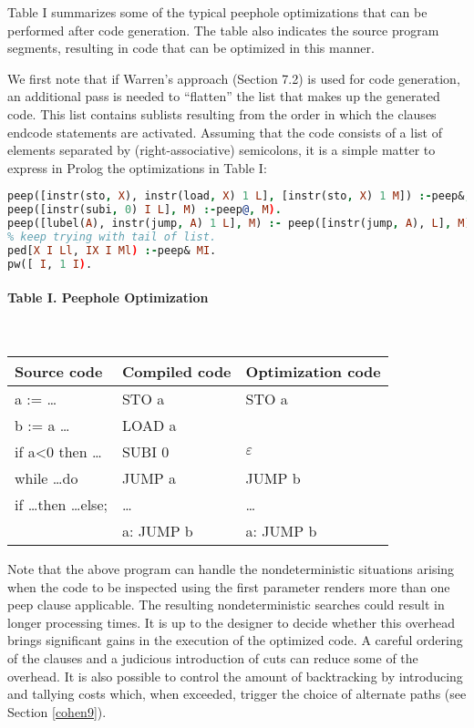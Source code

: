 \label{cohen82}

Table I summarizes some of the typical peephole optimizations that can be
performed after code generation. The table also indicates the source program
segments, resulting in code that can be optimized in this manner. 

We first note that if Warren’s approach (Section 7.2) is used for code generation,
an additional pass is needed to “flatten” the list that makes up the generated
code. This list contains sublists resulting from the order in which the clauses
endcode statements are activated. Assuming that the code consists of a list of
elements separated by (right-associative) semicolons, it is a simple matter to
express in Prolog the optimizations in Table I:
\begin{lstlisting}[language=prolog]
% if pattern is found perform the optimization.
peep([instr(sto, X), instr(load, X) 1 L], [instr(sto, X) 1 M]) :-peep&, M).
peep([instr(subi, 0) I L], M) :-peep@, M).
peep([lubel(A), instr(jump, A) 1 L], M) :- peep([instr(jump, A), L], M).
% keep trying with tail of list.
ped[X I Ll, IX I Ml) :-peep& MI.
pw([ I, 1 I).
\end{lstlisting}

\paragraph{Table I. Peephole Optimization}\ \\
\begin{tabular}{l l l}
\hline
Source code & Compiled code & Optimization code \\
\hline
a := \ldots & STO a & STO a \\
b := a \ldots & LOAD a & \\
\hline
if a<0 then \ldots & SUBI 0 & $\varepsilon$ \\
\hline
while \ldots do & JUMP a & JUMP b \\
if \ldots then \ldots else; & \ldots & \ldots \\
& a: JUMP b & a: JUMP b \\
\hline 
\end{tabular}\bigskip

Note that the above program can handle the nondeterministic situations arising
when the code to be inspected using the first parameter renders more than one
peep clause applicable. The resulting nondeterministic searches could result in 
longer processing times. It is up to the designer to decide whether this overhead
brings significant gains in the execution of the optimized code. A careful ordering
of the clauses and a judicious introduction of cuts can reduce some of the
overhead. It is also possible to control the amount of backtracking by introducing
and tallying costs which, when exceeded, trigger the choice of alternate paths
(see Section \ref{cohen9}). 

